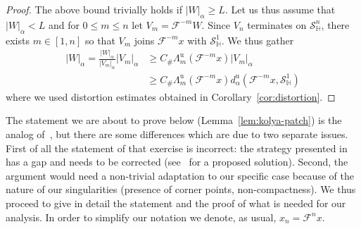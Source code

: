 \documentclass[10pt]{amsart}
\theoremstyle{definition}\newtheorem{defi}[theo]{Definition}\newtheorem{rema}[theo]{Remark}\newtheorem{exam}[theo]{Example}\newtheorem{exem}[theo]{Example}\newtheorem{nota}[theo]{Notation}
\newcommand{\unstable}{\text{u}}
\newcommand{\homo}{\mathbb{H}}
\newcommand{\cm}{\mathcal{F}}
\newcommand{\dadmPrivate}{d\adm}
\newcommand{\du}{\dadmPrivate^{\unstable}}
\newcommand{\singPrivate}{\mathcal{S}}
\newcommand{\hsing}[1]{{\singPrivate}_\homo^{#1}}
\newcommand{\adm}{_{\alpha^{+}}}
\newcommand{\Const}{C_\#}
\renewcommand{\adm}{_{\alpha}}
\begin{document}
\begin{proof}
The above bound trivially holds if $|W|\adm \ge L$. Let us thus assume that $|W|\adm < L$ and for $0\le m\le n$ let $V_{m} = \cm^{-m}W$. Since $V_{n}$ terminates on $\hsing{n}$, there exists $m\in[1,n]$ so that $V_{m}$ joins $\cm^{-m}x$ with $\hsing{1}$. We thus gather
\begin{align*}
|W|\adm= \frac{|W|\adm}{|V_{m}|\adm}|V_{m}|\adm
&\ge\Const \Lambda_{m}^{\unstable}(\cm^{-m}x) |V_{m}|\adm\\
&\ge\Const \Lambda_{m}^{\unstable}(\cm^{-m}x)\du\left(\cm^{-m}x,\hsing1\right)
\end{align*}
where we used distortion estimates obtained in Corollary~\ref{cor:distortion}.
\end{proof}

The statement we are about to prove below (Lemma~\ref{lem:kolya-patch}) is the analog of~\cite[Exercise~5.69]{ChM}, but there are some differences which are due to two separate issues. First of all the statement of that exercise is incorrect: the strategy presented in~\cite[\S5.5]{ChM} has a gap and needs to be corrected (see~\cite{kolya-patch} for a proposed solution). Second, the argument would need a non-trivial adaptation to our specific case because of the nature of our singularities (presence of corner points, non-compactness). We thus proceed to give in detail the statement and the proof of what is needed for our analysis. In order to simplify our notation we denote, as usual, $x_{n} = \cm^{n}x$.
\end{document}
